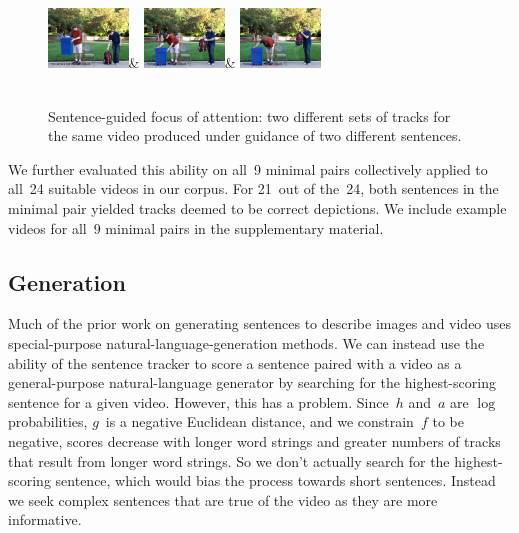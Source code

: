 \begin{figure}
\begin{tabular}
    \includegraphics[width=0.19\textwidth]{images/inference1b-0004}&
    \includegraphics[width=0.19\textwidth]{images/inference1b-0006}&
    \includegraphics[width=0.19\textwidth]{images/inference1b-0008}\\
    \\
  \end{tabular}
  \vspace*{-2ex}
  \caption{Sentence-guided focus of attention: two different sets of tracks for
    the same video produced under guidance of two different sentences.}
  \label{fig:inference}
  \vspace*{-5ex}
\end{figure}

We further evaluated this ability on all~9 minimal pairs collectively applied
to all~24 suitable videos in our corpus.
%
For 21~out of the~24, both sentences in the minimal pair yielded tracks deemed
to be correct depictions.
%
We include example videos for all~9 minimal pairs in the supplementary material.

\vspace*{-2ex}
\subsection{Generation}
\label{subsec:generation}
\vspace*{-2ex}

Much of the prior work on generating sentences to describe images
\citep{Jie2009, Farhadi2010, Li2011a, Yang2011, Gupta2012, Mitchell2012} and
video \citep{Kojima2002, Tena2007, Barbu2012a, Khan2012, Wang2012} uses
special-purpose natural-language-generation methods.
%
We can instead use the ability of the sentence tracker to score a sentence
paired with a video as a general-purpose natural-language generator by
searching for the highest-scoring sentence for a given video.
%
However, this has a problem.
%
Since~$h$ and~$a$ are $\log$ probabilities, $g$~is a negative Euclidean
distance, and we constrain~$f$ to be negative, scores decrease with longer word
strings and greater numbers of tracks that result from longer word strings.
%
So we don't actually search for the highest-scoring sentence, which would bias
the process towards short sentences.
%
Instead we seek complex sentences that are true of the video as they are more
informative.

